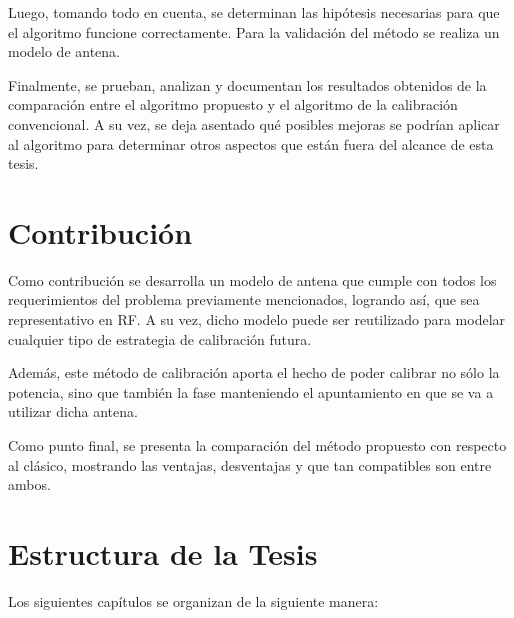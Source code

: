 Luego, tomando todo en cuenta, se determinan las hipótesis necesarias para que el algoritmo funcione correctamente. Para
la validación del método se realiza un modelo de antena.

Finalmente, se prueban, analizan y documentan los resultados obtenidos de la comparación entre el algoritmo propuesto
y el algoritmo de la calibración convencional. A su vez, se deja asentado qué posibles mejoras se podrían aplicar al
algoritmo para determinar otros aspectos que están fuera del alcance de esta tesis.

\section{Contribución} \label{sc:contribution}

Como contribución se desarrolla un modelo de antena que cumple con todos los requerimientos del problema previamente
mencionados, logrando así, que sea representativo en RF. A su vez, dicho modelo puede ser reutilizado para modelar cualquier 
tipo de estrategia de calibración futura.

Además, este método de calibración aporta el hecho de poder calibrar no sólo la potencia, sino que también la fase
manteniendo el apuntamiento en que se va a utilizar dicha antena.

Como punto final, se presenta la comparación del método propuesto con respecto al clásico, mostrando las ventajas, 
desventajas y que tan compatibles son entre ambos.


\section{Estructura de la Tesis} \label{sc:structure}

Los siguientes capítulos se organizan de la siguiente manera:

